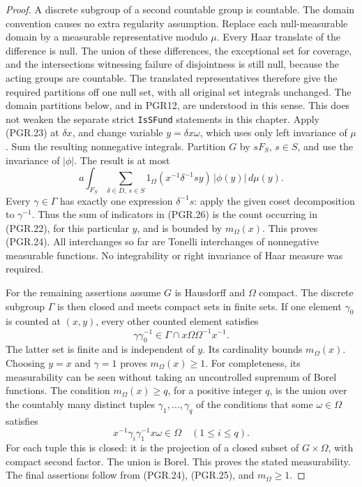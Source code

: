 \begin{proof}
A discrete subgroup of a second countable group is countable.
The domain convention causes no extra regularity assumption.
Replace each null-measurable domain by a measurable representative
modulo \(\mu\).  Every Haar translate of the difference is null.
The union of these differences, the exceptional set for coverage,
and the intersections witnessing failure of disjointness is still
null, because the acting groups are countable.  The translated
representatives therefore give the required partitions off one null
set, with all original set integrals unchanged.  The domain partitions
below, and in PGR12, are understood in this sense.  This does not
weaken the separate strict \texttt{IsSFund} statements in this chapter.
Apply (PGR.23) at \(\delta x\), and change variable
\(y=\delta x\omega\), which uses only left invariance of
\(\mu\).  Sum the resulting nonnegative integrals.  Partition
\(G\) by \(sF_S\), \(s\in S\), and use the invariance
of \(|\phi|\).  The result is at most
\[
 a\int_{F_S}\sum_{\delta\in D,\ s\in S}
    1_\Omega(x^{-1}\delta^{-1}s y)\,|\phi(y)|\,d\mu(y).
\tag{PGR.26}
\]
Every \(\gamma\in\Gamma\) has exactly one expression
\(\delta^{-1}s\): apply the given coset decomposition to
\(\gamma^{-1}\).  Thus the sum of indicators in (PGR.26)
is the count occurring in (PGR.22), for this particular \(y\),
and is bounded by \(m_\Omega(x)\).  This proves (PGR.24).
All interchanges so far are Tonelli interchanges of nonnegative
measurable functions.  No integrability or right invariance of Haar
measure was required.

For the remaining assertions assume \(G\) is Hausdorff and
\(\Omega\) compact.  The discrete subgroup \(\Gamma\) is
then closed and meets compact sets in finite sets.
If one element \(\gamma_0\) is
counted at \((x,y)\), every other counted element satisfies
\[
 \gamma\gamma_0^{-1}\in
                     \Gamma\cap x\Omega\Omega^{-1}x^{-1}.
\]
The latter set is finite and is independent of \(y\).  Its
cardinality bounds \(m_\Omega(x)\).  Choosing \(y=x\)
and \(\gamma=1\) proves \(m_\Omega(x)\geq1\).
For completeness, its measurability can be seen without taking an
uncontrolled supremum of Borel functions.  The condition
\(m_\Omega(x)\geq q\), for a positive integer \(q\), is the
union over the countably many distinct tuples
\(\gamma_1,\ldots,\gamma_q\) of the conditions that some
\(\omega\in\Omega\) satisfies
\[
       x^{-1}\gamma_i\gamma_1^{-1}x\omega\in\Omega
                                  \quad(1\leq i\leq q).
\]
For each tuple this is closed: it is the projection of a closed subset
of \(G\times\Omega\), with compact second factor.  The union
is Borel.  This proves the stated measurability.  The final assertions
follow from (PGR.24), (PGR.25), and \(m_\Omega\geq1\).
\end{proof}

